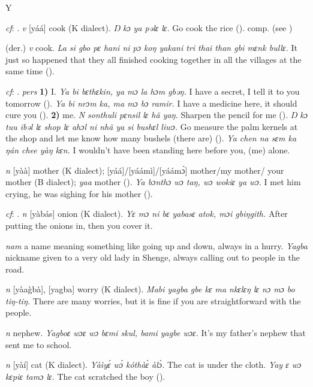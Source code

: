 \begin{letter}{Y}

 \textit{cf}: . \textit{v} [yáá] cook (K dialect). \textit{Ŋ kɔ ya pəlɛ lɛ.} Go cook the rice (\citealt{Pichl1967}). comp.  (see ) 

 (der.) \textit{v} cook. \textit{La si gbo pɛ hani ni pɔ koŋ yakani tri thai than gbi mɛnk bullɛ.} It just so happened that they all finished cooking together in all the villages at the same time (\citealt{Sumner1921}). 

 \textit{cf}: . \textit{pers} \textbf{1)} I. \textit{Ya bi bɛthɛkin, ya mɔ la hɔm gbəŋ.} I have a secret, I tell it to you tomorrow (\citealt{Pichl1967}). \textit{Ya bi nrɔm ka, ma mɔ bɔ ramir.} I have a medicine here, it should cure you (\citealt{Pichl1967}). \textbf{2)} me. \textit{N sonthuli pɛnsil lɛ hã yaŋ.} Sharpen the pencil for me (\citealt{Pichl1967}). \textit{Ŋ kɔ tuu ibəl lɛ shop lɛ ahɔl ni nhã ya si bushɛl liwɔ.} Go measure the palm kernels at the shop and let me know how many bushels (there are) (\citealt{Pichl1967}). \textit{Ya chen na sɛm ka ŋán chee yàŋ kɛn.} I wouldn't have been standing here before you, (me) alone. 

 \textit{n} [yàà] mother (K dialect); [yáá]/[yáámì]/[yáámɔ̀] mother/my mother/ your mother (B dialect); \textit{yaa} mother (\citealt{Pichl1967}). \textit{Ya bɔnthɔ wɔ taŋ, wɔ wokiɛ ya wɔ.} I met him crying, he was sighing for his mother (\citealt{Pichl1967}). 

 \textit{cf}: . \textit{n} [yàbás] onion (K dialect). \textit{Yɛ mɔ ni bɛ yabasɛ atok, mɔi gbiŋgith.} After putting the onions in, then you cover it.

 \textit{nam} a name meaning something like going up and down, always in a hurry. \textit{Yagba} nickname given to a very old lady in Shenge, always calling out to people in the road.

 \textit{n} [yàag̀bà], [yagba] worry (K dialect). \textit{Mabi yagba gbe kɛ ma nkɛlɛŋ lɛ nɔ mɔ bo tiŋ-tiŋ.} There are many worries, but it is fine if you are straightforward with the people.

 \textit{n} nephew. \textit{Yagboɛ wɔɛ wɔ bɛmi skul, bami yagbe wɔɛ.} It's my father's nephew that sent me to school.

 \textit{n} [yàí] cat (K dialect). \textit{Yàìyɛ́ wɔ́ kóthàɛ̀ àlɔ̀.} The cat is under the cloth. \textit{Yay ɛ wɔ kɛpiɛ tamɔ lɛ.} The cat scratched the boy (\citealt{Pichl1967}). 


\end{letter}
